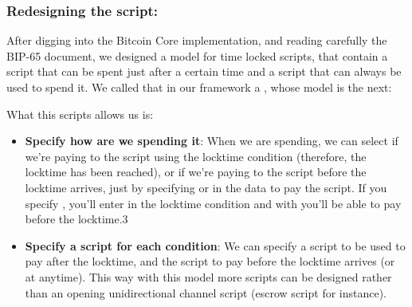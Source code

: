 \subsubsection{Redesigning the script:}
After digging into the Bitcoin Core implementation\cite{bitcoin-core:online}, and reading carefully the BIP-65 document\cite{bip-65:online}, we designed a model for time locked scripts, that contain a script that can be spent just after a certain time and a script that can always be used to spend it. We called that in our framework a , whose model is the next:
\begin{center}
\end{center}
What this scripts allows us is:
\begin{itemize}
    \item \textbf{Specify how are we spending it}: When we are spending, we can select if we're paying to the script using the locktime condition (therefore, the locktime has been reached), or if we're paying to the script before the locktime arrives, just by specifying  or  in the data to pay the script. If you specify , you'll enter in the locktime condition and with  you'll be able to pay before the locktime.3
    \item \textbf{Specify a script for each condition}: We can specify a script to be used to pay after the locktime, and the script to pay before the locktime arrives (or at anytime). This way with this model more scripts can be designed rather than an opening unidirectional channel script (escrow script for instance).
\end{itemize}
